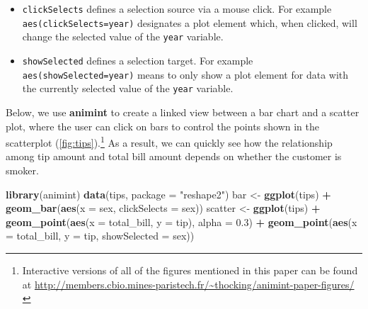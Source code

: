 \documentclass[12pt,]{article}
\newenvironment{Shaded}{\begin{snugshade}}{\end{snugshade}}
\newcommand{\DataTypeTok}[1]{\textcolor[rgb]{0.13,0.29,0.53}{#1}}
\newcommand{\FloatTok}[1]{\textcolor[rgb]{0.00,0.00,0.81}{#1}}
\newcommand{\KeywordTok}[1]{\textcolor[rgb]{0.13,0.29,0.53}{\textbf{#1}}}
\newcommand{\NormalTok}[1]{#1}
\newcommand{\OperatorTok}[1]{\textcolor[rgb]{0.81,0.36,0.00}{\textbf{#1}}}
\newcommand{\StringTok}[1]{\textcolor[rgb]{0.31,0.60,0.02}{#1}}
\providecommand{\tightlist}{%
  \setlength{\itemsep}{0pt}\setlength{\parskip}{0pt}}
\let\rmarkdownfootnote\footnote%
\def\footnote{\protect\rmarkdownfootnote}
\theoremstyle{definition}
\theoremstyle{definition}
\theoremstyle{definition}
\theoremstyle{remark}
\begin{document}
\begin{itemize}
\tightlist
\item
  \texttt{clickSelects} defines a selection source via a mouse click.
  For example \texttt{aes(clickSelects=year)} designates a plot element
  which, when clicked, will change the selected value of the
  \texttt{year} variable.
\item
  \texttt{showSelected} defines a selection target. For example
  \texttt{aes(showSelected=year)} means to only show a plot element for
  data with the currently selected value of the \texttt{year} variable.
\end{itemize}

Below, we use \textbf{animint} to create a linked view between a bar
chart and a scatter plot, where the user can click on bars to control
the points shown in the scatterplot
(\ref{fig:tips}).\footnote{Interactive versions of all of the figures
mentioned in this paper can be found at
\url{http://members.cbio.mines-paristech.fr/~thocking/animint-paper-figures/}}
As a result, we can quickly see how the relationship among tip amount
and total bill amount depends on whether the customer is smoker.

\begin{Shaded}
\begin{Highlighting}[]
\KeywordTok{library}\NormalTok{(animint)}
\KeywordTok{data}\NormalTok{(tips, }\DataTypeTok{package =} \StringTok{"reshape2"}\NormalTok{)}
\NormalTok{bar <-}\StringTok{ }\KeywordTok{ggplot}\NormalTok{(tips) }\OperatorTok{+}\StringTok{ }
\StringTok{  }\KeywordTok{geom_bar}\NormalTok{(}\KeywordTok{aes}\NormalTok{(}\DataTypeTok{x =}\NormalTok{ sex, }\DataTypeTok{clickSelects =}\NormalTok{ sex))}
\NormalTok{scatter <-}\StringTok{ }\KeywordTok{ggplot}\NormalTok{(tips) }\OperatorTok{+}
\StringTok{  }\KeywordTok{geom_point}\NormalTok{(}\KeywordTok{aes}\NormalTok{(}\DataTypeTok{x =}\NormalTok{ total_bill, }\DataTypeTok{y =}\NormalTok{ tip), }\DataTypeTok{alpha =} \FloatTok{0.3}\NormalTok{) }\OperatorTok{+}
\StringTok{  }\KeywordTok{geom_point}\NormalTok{(}\KeywordTok{aes}\NormalTok{(}\DataTypeTok{x =}\NormalTok{ total_bill, }\DataTypeTok{y =}\NormalTok{ tip, }\DataTypeTok{showSelected =}\NormalTok{ sex))}
\end{Highlighting}
\end{Shaded}
\end{document}
